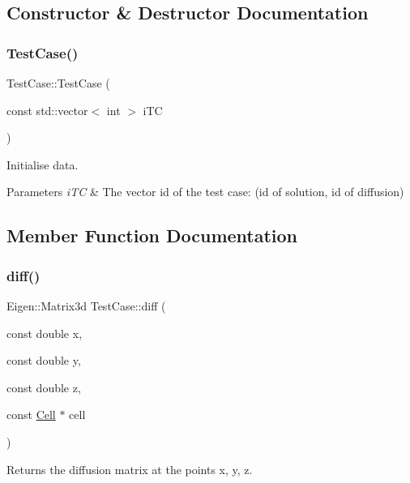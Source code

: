 \subsection{Constructor \& Destructor Documentation}
\mbox{\label{classTestCase_aa4ad29533416ee515205db87002a1bf1}} 
\subsubsection{\texorpdfstring{Test\+Case()}{TestCase()}}
{\footnotesize\ttfamily Test\+Case\+::\+Test\+Case (\begin{DoxyParamCaption}\item[{const std\+::vector$<$ int $>$}]{i\+TC }\end{DoxyParamCaption})}



Initialise data. 


\begin{DoxyParams}{Parameters}
{\em i\+TC} & The vector id of the test case\+: (id of solution, id of diffusion) \\
\hline
\end{DoxyParams}


\subsection{Member Function Documentation}
\mbox{\label{classTestCase_ae859f40ded10ed09eebc90f730954485}} 
\subsubsection{\texorpdfstring{diff()}{diff()}}
{\footnotesize\ttfamily Eigen\+::\+Matrix3d Test\+Case\+::diff (\begin{DoxyParamCaption}\item[{const double}]{x,  }\item[{const double}]{y,  }\item[{const double}]{z,  }\item[{const \hyperlink{classHArDCore3D_1_1Cell}{Cell} $\ast$}]{cell }\end{DoxyParamCaption})}



Returns the diffusion matrix at the points x, y, z. 

